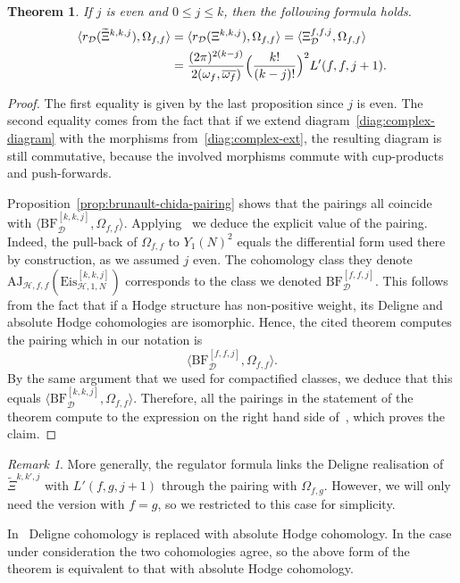 \documentclass[11pt, a4paper, reqno]{amsart}
\theoremstyle{definition}
\theoremstyle{plain}
\newtheorem{theorem}[definition]{Theorem}
\theoremstyle{remark}
\newtheorem*{remark}{Remark}
\newcommand{\BF}{\mathrm{BF}}
\newcommand{\lcBF}{\widetilde{\Xi}}
\newcommand{\cBF}{\Xi}
\newcommand{\del}{\mathcal{D}}
\newcommand{\AJ}{\mathrm{AJ}}
\newcommand{\regulator}[1]{r_{#1}}
\newcommand{\rD}{\regulator{\del}}
\renewcommand{\le}{\leqslant}
\renewcommand{\leq}{\le}
\begin{document}
\begin{theorem}
    \label{thm:regulator-formula}
    If $j$ is even and $0\leq j\leq k$, then the following formula holds.
    \[
        \begin{split}
            \langle \rD(\lcBF^{k,k,j}), \Omega_{f,f} \rangle &= \langle \rD(\cBF^{k,k,j}), \Omega_{f,f} \rangle = \langle \cBF^{f,f,j}_{\del}, \Omega_{f,f} \rangle \\
            &= \frac{(2\pi)^{2(k-j)}}{2(\omega_f,\overline{\omega_f})}\Bigl(\frac{k!}{(k-j)!}\Bigr)^2 L'(f,f,j+1).
        \end{split}
    \]
\end{theorem}
\begin{proof}
    The first equality is given by the last proposition since $j$ is even. The second equality comes from the fact that if we extend diagram~\ref{diag:complex-diagram} with the morphisms from~\eqref{diag:complex-ext}, the resulting diagram is still commutative, because the involved morphisms commute with cup-products and push-forwards.

    Proposition~\ref{prop:brunault-chida-pairing} shows that the pairings all coincide with $\langle \BF^{[k,k,j]}_{\del},\Omega_{f,f}\rangle$. Applying~\cite[Theorem~6.2.9]{KLZ20} we deduce the explicit value of the pairing. Indeed, the pull-back of $\Omega_{f,f}$ to $Y_1(N)^2$ equals the differential form used there by construction, as we assumed $j$ even. The cohomology class they denote $\AJ_{\mathcal{H},f,f}(\mathrm{Eis}^{[k,k,j]}_{\mathcal{H},1,N})$ corresponds to the class we denoted $\BF^{[f,f,j]}_{\del}$. This follows from the fact that if a Hodge structure has non-positive weight, its Deligne and absolute Hodge cohomologies are isomorphic. Hence, the cited theorem computes the pairing which in our notation is
    \[
        \langle \BF^{[f,f,j]}_{\del}, \Omega_{f,f} \rangle.
    \]
    By the same argument that we used for compactified classes, we deduce that this equals $\langle \BF^{[k,k,j]}_{\del}, \Omega_{f,f} \rangle$. Therefore, all the pairings in the statement of the theorem compute to the expression on the right hand side of~\cite[Theorem~6.2.9]{KLZ20}, which proves the claim.
\end{proof}
\begin{remark}
    More generally, the regulator formula links the Deligne realisation of $\lcBF^{k,k',j}$ with $L'(f,g,j+1)$ through the pairing with $\Omega_{f,g}$. However, we will only need the version with $f=g$, so we restricted to this case for simplicity.
\end{remark}
In~\cite{KLZ20} Deligne cohomology is replaced with absolute Hodge cohomology. In the case under consideration the two cohomologies agree, so the above form of the theorem is equivalent to that with absolute Hodge cohomology.
\end{document}
